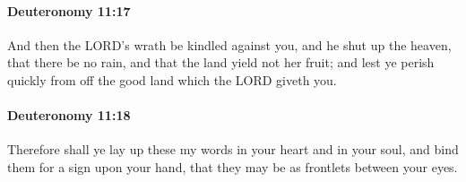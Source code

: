 		\paragraph{Deuteronomy 11:17} %
			\label{DEUTERONOMY-11-17}

			And then the LORD's wrath be kindled against you, and he shut up the heaven, that there be no rain, and that the land yield not her fruit; and lest ye perish quickly from off the good land which the LORD giveth you.


		\paragraph{Deuteronomy 11:18} %
			\label{DEUTERONOMY-11-18}

			Therefore shall ye lay up these my words in your heart and in your soul, and bind them for a sign upon your hand, that they may be as frontlets between your eyes.

